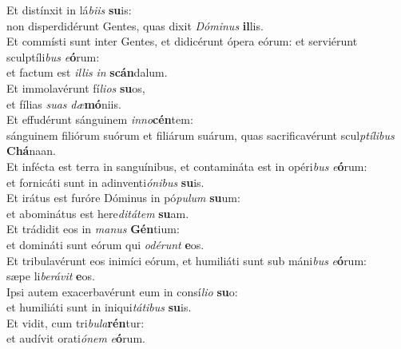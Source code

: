 \oddverse Et distínxit in lá\textit{bi}\textit{is} \textbf{su}is:~\*\\
\oddverse non disperdidérunt Gentes, quas dixit \textit{Dó}\textit{mi}\textit{nus} \textbf{il}lis.\\
\evenverse Et commísti sunt inter Gentes, et didicérunt ópera eórum: et serviérunt sculptíli\textit{bus} \textit{e}\textbf{ó}rum:~\*\\
\evenverse et factum est \textit{il}\textit{lis} \textit{in} \textbf{scán}dalum.\\
\oddverse Et immolavérunt fí\textit{li}\textit{os} \textbf{su}os,~\*\\
\oddverse et fílias \textit{su}\textit{as} \textit{dæ}\textbf{mó}niis.\\
\evenverse Et effudérunt sánguinem \textit{in}\textit{no}\textbf{cén}tem:~\*\\
\evenverse sánguinem filiórum suórum et filiárum suárum, quas sacrificavérunt scul\textit{ptí}\textit{li}\textit{bus} \textbf{Chá}naan.\\
\oddverse Et infécta est terra in sanguínibus, et contamináta est in opéri\textit{bus} \textit{e}\textbf{ó}rum:~\*\\
\oddverse et fornicáti sunt in adinventi\textit{ó}\textit{ni}\textit{bus} \textbf{su}is.\\
\evenverse Et irátus est furóre Dóminus in pó\textit{pu}\textit{lum} \textbf{su}um:~\*\\
\evenverse et abominátus est here\textit{di}\textit{tá}\textit{tem} \textbf{su}am.\\
\oddverse Et trádidit eos in \textit{ma}\textit{nus} \textbf{Gén}tium:~\*\\
\oddverse et domináti sunt eórum qui \textit{o}\textit{dé}\textit{runt} \textbf{e}os.\\
\evenverse Et tribulavérunt eos inimíci eórum, et humiliáti sunt sub máni\textit{bus} \textit{e}\textbf{ó}rum:~\*\\
\evenverse sæpe li\textit{be}\textit{rá}\textit{vit} \textbf{e}os.\\
\oddverse Ipsi autem exacerbavérunt eum in consí\textit{li}\textit{o} \textbf{su}o:~\*\\
\oddverse et humiliáti sunt in iniqui\textit{tá}\textit{ti}\textit{bus} \textbf{su}is.\\
\evenverse Et vidit, cum tri\textit{bu}\textit{la}\textbf{rén}tur:~\*\\
\evenverse et audívit orati\textit{ó}\textit{nem} \textit{e}\textbf{ó}rum.\\
